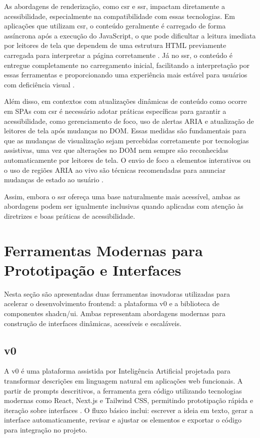 As abordagens de renderização, como \acrshort{csr} e \acrshort{ssr}, impactam diretamente a acessibilidade, especialmente na compatibilidade com essas tecnologias. Em aplicações que utilizam \acrshort{csr}, o conteúdo geralmente é carregado de forma assíncrona após a execução do JavaScript, o que pode dificultar a leitura imediata por leitores de tela que dependem de uma estrutura HTML previamente carregada para interpretar a página corretamente \cite{pixelfree2023access}. Já no \acrshort{ssr}, o conteúdo é entregue completamente no carregamento inicial, facilitando a interpretação por essas ferramentas e proporcionando uma experiência mais estável para usuários com deficiência visual \cite{atori2024}.

Além disso, em contextos com atualizações dinâmicas de conteúdo como ocorre em SPAs com \acrshort{csr} é necessário adotar práticas específicas para garantir a acessibilidade, como gerenciamento de foco, uso de alertas ARIA e atualização de leitores de tela após mudanças no DOM. Essas medidas são fundamentais para que as mudanças de visualização sejam percebidas corretamente por tecnologias assistivas, uma vez que alterações no DOM nem sempre são reconhecidas automaticamente por leitores de tela. O envio de foco a elementos interativos ou o uso de regiões ARIA ao vivo são técnicas recomendadas para anunciar mudanças de estado ao usuário \cite{sutton2018}.

Assim, embora o \acrshort{ssr} ofereça uma base naturalmente mais acessível, ambas as abordagens podem ser igualmente inclusivas quando aplicadas com atenção às diretrizes e boas práticas de acessibilidade.



\section{Ferramentas Modernas para Prototipação e Interfaces}
\label{sec:ferramentas-modernas}

Nesta seção são apresentadas duas ferramentas inovadoras utilizadas para acelerar o desenvolvimento frontend: a plataforma v0 e a biblioteca de componentes shadcn/ui. Ambas representam abordagens modernas para construção de interfaces dinâmicas, acessíveis e escaláveis.

\subsection{v0}
\label{subsec:v0}

A v0 é uma plataforma assistida por Inteligência Artificial projetada para transformar descrições em linguagem natural em aplicações web funcionais. A partir de prompts descritivos, a ferramenta gera código utilizando tecnologias modernas como React, Next.js e Tailwind CSS, permitindo prototipação rápida e iteração sobre interfaces \cite{v0_docs}. O fluxo básico inclui: escrever a ideia em texto, gerar a interface automaticamente, revisar e ajustar os elementos e exportar o código para integração no projeto.

